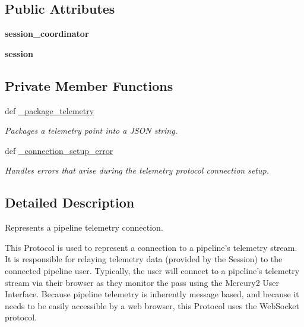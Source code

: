 \subsection*{Public Attributes}
\begin{DoxyCompactItemize}
\item 
\hypertarget{classhwm_1_1network_1_1protocols_1_1telemetry_1_1_pipeline_telemetry_a6fbedbfdea09d930e9f631c22f332675}{{\bfseries session\-\_\-coordinator}}\label{classhwm_1_1network_1_1protocols_1_1telemetry_1_1_pipeline_telemetry_a6fbedbfdea09d930e9f631c22f332675}

\item 
\hypertarget{classhwm_1_1network_1_1protocols_1_1telemetry_1_1_pipeline_telemetry_a1450a728295ded4baf04a6c3edbef10d}{{\bfseries session}}\label{classhwm_1_1network_1_1protocols_1_1telemetry_1_1_pipeline_telemetry_a1450a728295ded4baf04a6c3edbef10d}

\end{DoxyCompactItemize}
\subsection*{Private Member Functions}
\begin{DoxyCompactItemize}
\item 
def \hyperlink{classhwm_1_1network_1_1protocols_1_1telemetry_1_1_pipeline_telemetry_a4c453f4727b3e7ad2f02da3fc998c844}{\-\_\-package\-\_\-telemetry}
\begin{DoxyCompactList}\small\item\em Packages a telemetry point into a J\-S\-O\-N string. \end{DoxyCompactList}\item 
def \hyperlink{classhwm_1_1network_1_1protocols_1_1telemetry_1_1_pipeline_telemetry_ab4ed3eb62a12fa5492613c87bd3a3e10}{\-\_\-connection\-\_\-setup\-\_\-error}
\begin{DoxyCompactList}\small\item\em Handles errors that arise during the telemetry protocol connection setup. \end{DoxyCompactList}\end{DoxyCompactItemize}


\subsection{Detailed Description}
Represents a pipeline telemetry connection. 

This Protocol is used to represent a connection to a pipeline's telemetry stream. It is responsible for relaying telemetry data (provided by the Session) to the connected pipeline user. Typically, the user will connect to a pipeline's telemetry stream via their browser as they monitor the pass using the Mercury2 User Interface. Because pipeline telemetry is inherently message based, and because it needs to be easily accessible by a web browser, this Protocol uses the Web\-Socket protocol.

